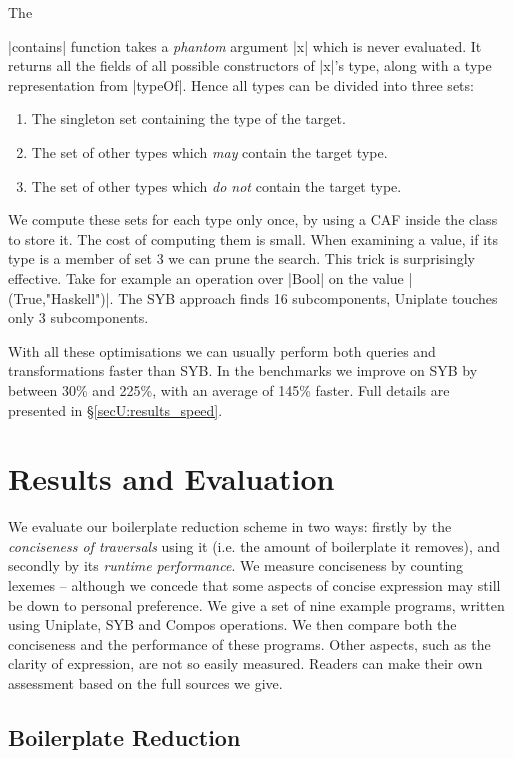The \ignore|contains| function takes a \textit{phantom} argument |x| which is never evaluated. It returns all the fields of all possible constructors of |x|'s type, along with a type representation from |typeOf|. Hence all types can be divided into three sets:

\begin{enumerate}
\item The singleton set containing the type of the target.
\item The set of other types which \textit{may} contain the target type.
\item The set of other types which \textit{do not} contain the target type.
\end{enumerate}

We compute these sets for each type only once, by using a CAF inside the class to store it. The cost of computing them is small. When examining a value, if its type is a member of set 3 we can prune the search. This trick is surprisingly effective. Take for example an operation over |Bool| on the value |(True,"Haskell")|. The SYB approach finds 16 subcomponents, Uniplate touches only 3 subcomponents.

With all these optimisations we can usually perform both queries and transformations faster than SYB. In the benchmarks we improve on SYB by between 30\% and 225\%, with an average of 145\% faster. Full details are presented in \S\ref{secU:results_speed}.


\section{Results and Evaluation}
\label{secU:results}

We evaluate our boilerplate reduction scheme in two ways: firstly by the \textit{conciseness of traversals} using it (i.e. the amount of boilerplate it removes), and secondly by its \textit{runtime performance}. We measure conciseness by counting lexemes -- although we concede that some aspects of concise expression may still be down to personal preference. We give a set of nine example programs, written using Uniplate, SYB and Compos operations. We then compare both the conciseness and the performance of these programs. Other aspects, such as the clarity of expression, are not so easily measured. Readers can make their own assessment based on the full sources we give.

\subsection{Boilerplate Reduction}
\label{secU:results_boilerplate}

